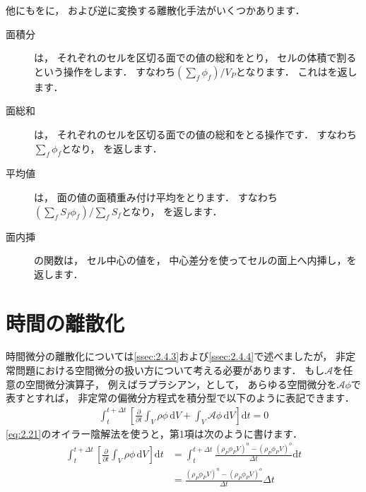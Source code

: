 他にもをに，
および逆に変換する離散化手法がいくつかあります．
\begin{description}
 \item[面積分] は，
            それぞれのセルを区切る面での値の総和をとり，
            セルの体積で割るという操作をします．
            すなわち$(\sum_{f}\phi_{f})/V_{P}$となります．
            これはを返します．
 \item[面総和] は，
            それぞれのセルを区切る面での値の総和をとる操作です．
            すなわち$\sum_{f}\phi_{f}$となり，
            を返します．
 \item[平均値] は，
            面の値の面積重み付け平均をとります．
            すなわち$(\sum_{f}S_{f}\phi_{f})/\sum_{f}S_{f}$となり，
            を返します．
 \item[面内挿] の関数は，
            セル中心の値を，
            中心差分を使ってセルの面上へ内挿し，を返します．
\end{description}



\section{時間の離散化}
\label{sec:2.5}
%
時間微分の離散化については\autoref{ssec:2.4.3}および\autoref{ssec:2.4.4}で述べましたが，
非定常問題における空間微分の扱い方について考える必要があります．
もし$\mathcal{A}$を任意の空間微分演算子，
例えばラプラシアン，として，
あらゆる空間微分を$\mathcal{A}\phi$で表すとすれば，
非定常の偏微分方程式を積分型で以下のように表記できます．
\begin{align}
 \label{eq:2.30}
 \int_{t}^{t + \Delta t}\left[\frac{\partial}{\partial t}\int_{V}\rho\phi\,\mathrm{d}V
 + \int_{V}\mathcal{A}\phi\,\mathrm{d}V\right]\mathrm{d}t = 0
\end{align}
\autoref{eq:2.21}のオイラー陰解法を使うと，第1項は次のように書けます．
\begin{align}
 \label{eq:2.31}
 \int_{t}^{t + \Delta t}
 \left[\frac{\partial}{\partial t}\int_{V}\rho\phi\,\mathrm{d}V\right]\mathrm{d}t
 &= \int_{t}^{t + \Delta t}
 \frac{(\rho_{P}\phi_{P}V)^{n} - (\rho_{P}\phi_{P}V)^{o}}{\Delta t}\mathrm{d}t \\
 &= \frac{(\rho_{P}\phi_{P}V)^{n} - (\rho_{P}\phi_{P}V)^{o}}{\Delta t}\Delta t
\end{align}

